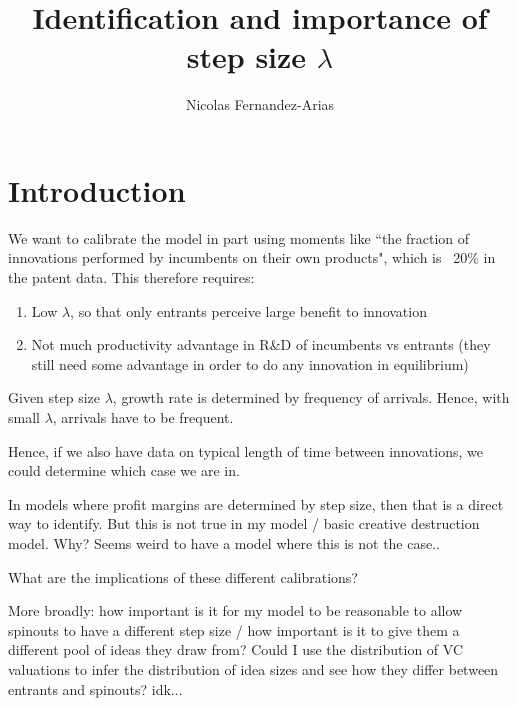 \documentclass[12pt,english]{article}
\theoremstyle{remark}
\begin{document}
	
\title{Identification and importance of step size $\lambda$}
\author{Nicolas Fernandez-Arias}
\maketitle

\section{Introduction}

We want to calibrate the model in part using moments like ``the fraction of innovations performed by incumbents on their own products", which is ~20\% in the patent data. This therefore requires:

\begin{enumerate}
	\item Low $\lambda$, so that only entrants perceive large benefit to innovation
	\item Not much productivity advantage in R\&D of incumbents vs entrants (they still need some advantage in order to do any innovation in equilibrium)
\end{enumerate}

Given step size $\lambda$, growth rate is determined by frequency of arrivals. Hence, with small $\lambda$, arrivals have to be frequent. 

Hence, if we also have data on typical length of time between innovations, we could determine which case we are in.

In models where profit margins are determined by step size, then that is a direct way to identify. But this is not true in my model / basic creative destruction model. Why? Seems weird to have a model where this is not the case..

What are the implications of these different calibrations? 

More broadly: how important is it for my model to be reasonable to allow spinouts to have a different step size / how important is it to give them a different pool of ideas they draw from? Could I use the distribution of VC valuations to infer the distribution of idea sizes and see how they differ between entrants and spinouts? idk...






 
\end{document}
